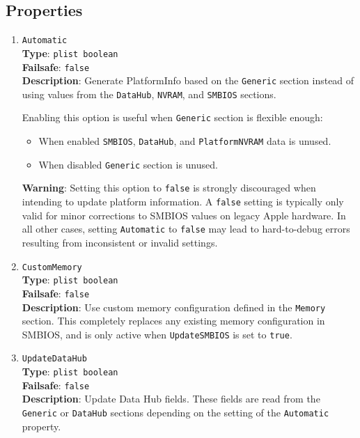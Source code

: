 \documentclass[]{article}
\makeatletter
\providecommand{\tightlist}{%
  \setlength{\itemsep}{0pt}\setlength{\parskip}{0pt}}
\renewcommand{\label}[1]{%
\zref@wrapper@immediate{\oldlabel{#1}}}  %
\makeatother
\begin{document}
\subsection{Properties}\label{platforminfoprops}

\begin{enumerate}
\item
  \texttt{Automatic}\\
  \textbf{Type}: \texttt{plist\ boolean}\\
  \textbf{Failsafe}: \texttt{false}\\
  \textbf{Description}: Generate PlatformInfo based on the \texttt{Generic}
  section instead of using values from the \texttt{DataHub}, \texttt{NVRAM},
  and \texttt{SMBIOS} sections.

  Enabling this option is useful when \texttt{Generic} section is flexible
  enough:
  \begin{itemize}
  \tightlist
  \item When enabled \texttt{SMBIOS}, \texttt{DataHub}, and
  \texttt{PlatformNVRAM} data is unused.
  \item When disabled \texttt{Generic} section is unused.
  \end{itemize}

  \textbf{Warning}: Setting this option to \texttt{false} is strongly discouraged when
  intending to update platform information. A \texttt{false} setting is typically only
  valid for minor corrections to SMBIOS values on legacy Apple hardware. In all other
  cases, setting \texttt{Automatic} to \texttt{false} may lead to hard-to-debug errors
  resulting from inconsistent or invalid settings.

\item
  \texttt{CustomMemory}\\
  \textbf{Type}: \texttt{plist\ boolean}\\
  \textbf{Failsafe}: \texttt{false}\\
  \textbf{Description}: Use custom memory configuration defined in the
  \texttt{Memory} section. This completely replaces any existing memory
  configuration in SMBIOS, and is only active when \texttt{UpdateSMBIOS}
  is set to \texttt{true}.

\item
  \texttt{UpdateDataHub}\\
  \textbf{Type}: \texttt{plist\ boolean}\\
  \textbf{Failsafe}: \texttt{false}\\
  \textbf{Description}: Update Data Hub fields. These fields are read
  from the \texttt{Generic} or \texttt{DataHub} sections depending on
  the setting of the \texttt{Automatic} property.


\end{enumerate}
\end{document}
